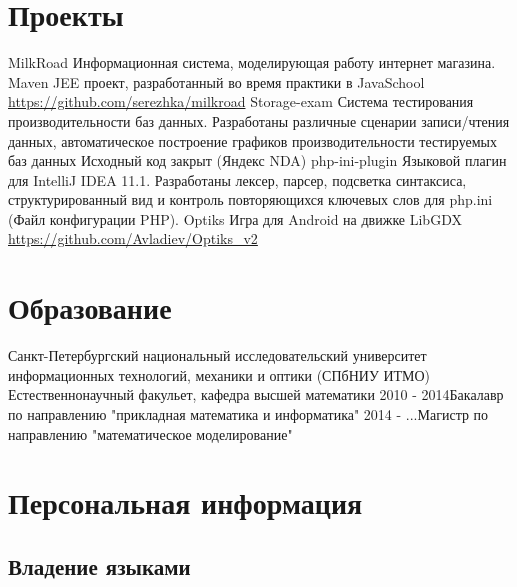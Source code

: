 \documentclass[11pt,a4paper,russian]{moderncv}
\begin{document}
\newpage  

\section{Проекты}
\cvline
    {MilkRoad}
    {Информационная система, моделирующая работу интернет магазина. Maven JEE проект, разработанный во время практики в JavaSchool \newline
    \url{https://github.com/serezhka/milkroad}}
\cvline
    {Storage-exam}
    {Система тестирования производительности баз данных.\newline
    Разработаны различные сценарии записи/чтения данных, автоматическое построение графиков производительности тестируемых баз данных \newline Исходный код закрыт (Яндекс NDA)}
\cvline
    {php-ini-plugin}
    {Языковой плагин для IntelliJ IDEA 11.1. \newline
    Разработаны лексер, парсер, подсветка синтаксиса, структурированный вид и контроль повторяющихся ключевых слов для php.ini (Файл   конфигурации PHP).}  
\cvline
    {Optiks}
    {Игра для Android на движке LibGDX \newline
    \url{https://github.com/Avladiev/Optiks_v2}}
    
\section{Образование}
\cventry{}
    {\textnormal{Санкт-Петербургский национальный исследовательский университет информационных технологий, механики и оптики}{ (СПбНИУ ИТМО)}}
    {Естественнонаучный факульет, кафедра высшей математики}{}{}{}
\cventry
    {2010 - 2014}{Бакалавр по направлению "прикладная математика и информатика"}{}{}{}{}
\cventry
    {2014 - ...}{Магистр по направлению "математическое моделирование"}{}{}{}{}

\section{Персональная информация}

\subsection{Владение языками}
\end{document}
